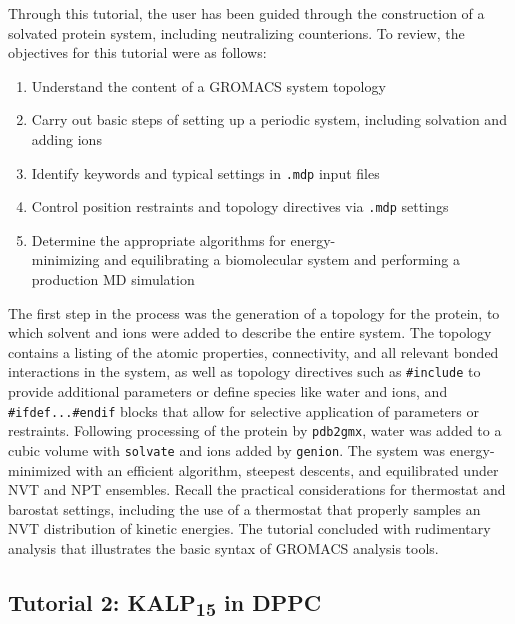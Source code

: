 \documentclass[9pt,tutorial]{livecoms}
\begin{document}
Through this tutorial, the user has been guided through the construction of a solvated protein system, including neutralizing counterions. To review, the objectives for this tutorial were as follows:

\begin{enumerate}
	\item Understand the content of a GROMACS system topology
	\item Carry out basic steps of setting up a periodic system, including solvation and adding ions
	\item Identify keywords and typical settings in \texttt{.mdp} input files
	\item Control position restraints and topology directives via \texttt{.mdp} settings
	\item Determine the appropriate algorithms for energy-\\minimizing and equilibrating a biomolecular system and performing a production MD simulation
\end{enumerate}

The first step in the process was the generation of a topology for the protein, to which solvent and ions were added to describe the entire system. The topology contains a listing of the atomic properties, connectivity, and all relevant bonded interactions in the system, as well as topology directives such as \texttt{\#include} to provide additional parameters or define species like water and ions, and \texttt{\#ifdef...\#endif} blocks that allow for selective application of parameters or restraints. Following processing of the protein by \texttt{pdb2gmx}, water was added to a cubic volume with \texttt{solvate} and ions added by \texttt{genion}. The system was energy-minimized with an efficient algorithm, steepest descents, and equilibrated under NVT and NPT ensembles. Recall the practical considerations for thermostat and barostat settings, including the use of a thermostat that properly samples an NVT distribution of kinetic energies. The tutorial concluded with rudimentary analysis that illustrates the basic syntax of GROMACS analysis tools.



\subsection{Tutorial 2: KALP\textsubscript{15} in DPPC} \label{kalp}
\end{document}

